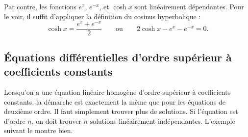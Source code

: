 \begin{example}
Par contre, les fonctions  $e^x$, $e^{-x}$, et $\cosh x$ sont linéairement dépendantes.  Pour le voir, il suffit d'appliquer la définition du cosinus hyperbolique : 
\begin{equation*}
\cosh x = \frac{e^x + e^{-x}}{2} 
\qquad
\text{ou}
\qquad
2 \cosh x - e^x - e^{-x} = 0.
\end{equation*}
\end{example}

\subsection[EDO d'ordre supérieur à coefficients constants]{Équations différentielles d'ordre supérieur à coefficients constants}

Lorsqu'on a une équation linéaire homogène d'ordre supérieur à coefficients constants, la démarche est exactement la même que pour les équations de deuxième ordre. Il faut simplement trouver plus de solutions. Si l'équation est d'ordre
$n$, on doit trouver $n$ solutions linéairement indépendantes.
L'exemple suivant le montre bien.

